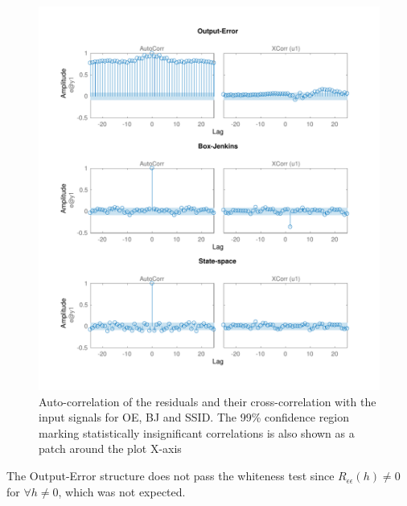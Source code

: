\documentclass[a4paper,11pt]{article}
\begin{document}
\begin{figure}[H]
\centering
\includegraphics[width=\textwidth]{images/ce3_5_2_system_resid2}
\caption{Auto-correlation of the residuals and their cross-correlation with the input signals for OE, BJ and SSID. The 99\% confidence region marking statistically insignificant correlations is also shown as a patch around the plot X-axis}
\label{fig:syst_resid2}
\end{figure}

The Output-Error structure does not pass the whiteness test since $R_{\epsilon\epsilon}(h) \neq 0$ for $\forall h \neq 0$, which was not expected.
\end{document}
